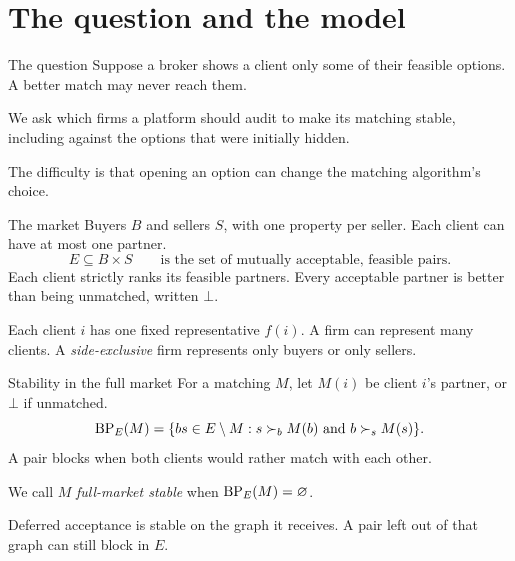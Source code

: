 \section{The question and the model}
\begin{frame}[t,label=question]{The question}
\small
Suppose a broker shows a client only some of their feasible options.
A better match may never reach them.

\medskip
We ask which firms a platform should audit to make its matching stable,
including against the options that were initially hidden.

\medskip
The difficulty is that opening an option can change the matching
algorithm's choice.
\end{frame}

\begin{frame}[t,label=clients]{The market}
\small
Buyers $B$ and sellers $S$, with one property per seller.
Each client can have at most one partner.
\[
 E\subseteq B\times S
 \qquad\text{is the set of mutually acceptable, feasible pairs.}
\]
Each client strictly ranks its feasible partners. Every acceptable partner
is better than being unmatched, written $\bot$.

\medskip
Each client $i$ has one fixed representative $f(i)$.
A firm can represent many clients. A \emph{side-exclusive} firm represents
only buyers or only sellers.
\end{frame}

\begin{frame}[t,label=blocking]{Stability in the full market}
\small
For a matching $M$, let $M(i)$ be client $i$'s partner, or $\bot$ if unmatched.
\[
 \operatorname{BP}_E(M)=\{bs\in E\setminus M:
 s\succ_b M(b)\ \text{and}\ b\succ_s M(s)\}.
\]
A pair blocks when both clients would rather match with each other.

\medskip
We call $M$ \emph{full-market stable} when $\operatorname{BP}_E(M)=\varnothing$.

\medskip
Deferred acceptance is stable on the graph it receives.
A pair left out of that graph can still block in $E$.
\end{frame}

